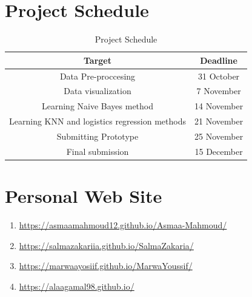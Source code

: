 \documentclass[a4paper, 11pt, oneside]{article} %
\begin{document}
\section{Project Schedule}
\begin{table}[ht]
\caption{Project Schedule} %
\centering %
\begin{tabular}{c c } %
\hline\hline %
Target & Deadline \\ [0.5ex] %
\hline %
Data Pre-proccesing & 31 October \\ %
Data visualization & 7 November \\
Learning Naive Bayes method & 14 November  \\
Learning KNN and logistics regression methods   & 21 November \\
Submitting Prototype & 25 November \\
Final submission & 15 December \\ [1ex] %
\hline %
\end{tabular}
\label{table:nonlin} %
\end{table}
\vfil
\section{Personal Web Site}
\begin{enumerate}
\item \url {https://asmaamahmoud12.github.io/Asmaa-Mahmoud/}
\item \url {https://salmazakariia.github.io/SalmaZakaria/}
\item \url {https://marwaayosiif.github.io/MarwaYoussif/}
\item \url {https://alaagamal98.github.io/}
\end{enumerate}
\end{document}
